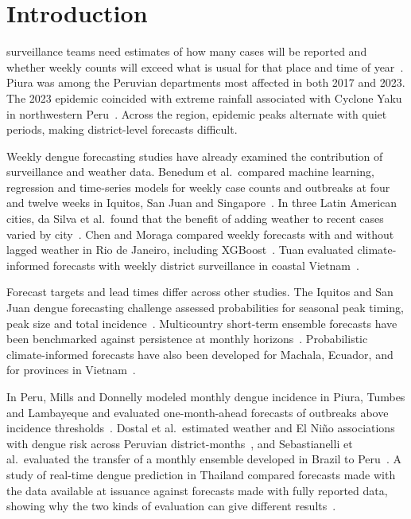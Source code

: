 \documentclass[journal]{IEEEtran}
\begin{document}
\section{Introduction}
 surveillance teams need estimates of how many cases will be reported and whether weekly counts will exceed what is usual for that place and time of year~\cite{who2016}. Piura was among the Peruvian departments most affected in both 2017 and 2023. The 2023 epidemic coincided with extreme rainfall associated with Cyclone Yaku in northwestern Peru~\cite{munayco2024}. Across the region, epidemic peaks alternate with quiet periods, making district-level forecasts difficult.

Weekly dengue forecasting studies have already examined the contribution of surveillance and weather data. Benedum et al.\ compared machine learning, regression and time-series models for weekly case counts and outbreaks at four and twelve weeks in Iquitos, San Juan and Singapore~\cite{benedum2020}. In three Latin American cities, da Silva et al.\ found that the benefit of adding weather to recent cases varied by city~\cite{dasilva2025}. Chen and Moraga compared weekly forecasts with and without lagged weather in Rio de Janeiro, including XGBoost~\cite{chen2025}. Tuan evaluated climate-informed forecasts with weekly district surveillance in coastal Vietnam~\cite{tuan2026}.

Forecast targets and lead times differ across other studies. The Iquitos and San Juan dengue forecasting challenge assessed probabilities for seasonal peak timing, peak size and total incidence~\cite{johansson2019}. Multicountry short-term ensemble forecasts have been benchmarked against persistence at monthly horizons~\cite{wu2025}. Probabilistic climate-informed forecasts have also been developed for Machala, Ecuador, and for provinces in Vietnam~\cite{lowe2017,colongonzalez2021}.

In Peru, Mills and Donnelly modeled monthly dengue incidence in Piura, Tumbes and Lambayeque and evaluated one-month-ahead forecasts of outbreaks above incidence thresholds~\cite{mills2024}. Dostal et al.\ estimated weather and El Ni\~no associations with dengue risk across Peruvian district-months~\cite{dostal2022}, and Sebastianelli et al.\ evaluated the transfer of a monthly ensemble developed in Brazil to Peru~\cite{sebastianelli2024}. A study of real-time dengue prediction in Thailand compared forecasts made with the data available at issuance against forecasts made with fully reported data, showing why the two kinds of evaluation can give different results~\cite{reich2016}.
\end{document}
